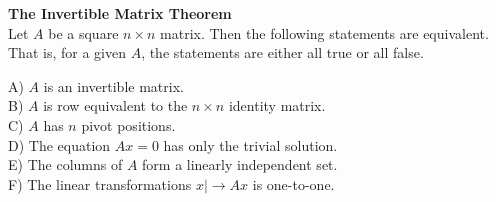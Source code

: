 \textbf{The Invertible Matrix Theorem}\\
Let $ A $ be a square $ n \times n $ matrix. Then the following statements are equivalent. That is, for a given $ A $, the statements are either all true or all false.

A) $ A $ is an invertible matrix.\\
B) $ A $ is row equivalent to the $ n \times n $ identity matrix.\\
C) $ A $ has $ n $ pivot positions.\\
D) The equation $ Ax=0 $ has only the trivial solution.\\
E) The columns of $ A $ form a linearly independent set.\\
F) The linear transformations $ x |\to Ax $ is one-to-one.  
